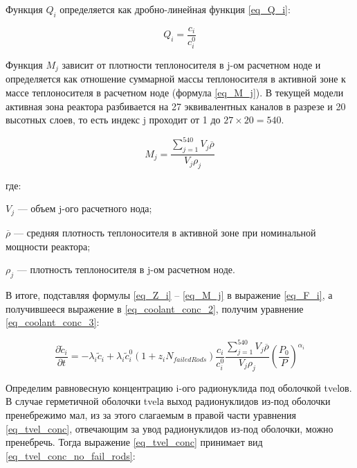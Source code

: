 Функция $Q_{i}$ определяется как дробно-линейная функция \ref{eq_Q_i}:

\begin{equation}
    \label{eq_Q_i}
    Q_{i} = \frac{c_{i}}{c_{i}^{0}}
\end{equation}

Функция $M_{j}$ зависит от плотности теплоносителя в j-ом расчетном ноде и определяется как отношение суммарной массы 
теплоносителя в активной зоне к массе теплоносителя в расчетном ноде (формула \ref{eq_M_j}). В текущей модели активная 
зона реактора разбивается на 27 эквивалентных каналов в разрезе и 20 высотных слоев, то есть индекс j проходит от 1 до 
$27 \times 20 = 540$.

\begin{equation}
    \label{eq_M_j}
    M_{j} = \frac{\sum_{j=1}^{540} V_{j}\overline{\rho}}{V_{j}\rho_{j}}
\end{equation}

где:
\begin{description}
    \item $V_{j}$ --- объем j-ого расчетного нода;
    \item $\overline{\rho}$ --- средняя плотность теплоносителя в активной зоне при номинальной мощности реактора;
    \item $\rho_{j}$ --- плотность теплоносителя в j-ом расчетном ноде.
\end{description}

В итоге, подставляя формулы \ref{eq_Z_i} -- \ref{eq_M_j} в выражение \ref{eq_F_i}, а получившееся выражение в 
\ref{eq_coolant_conc_2}, получим уравнение \ref{eq_coolant_conc_3}:

\begin{equation}
    \label{eq_coolant_conc_3}
    \frac{\partial \widetilde{c}_{i}}{\partial t} = -\lambda_{i}\widetilde{c}_{i} + \lambda_{i}\widetilde{c}_{i}^{0}
        (1 + z_{i}N_{failedRods})\frac{c_{i}}{c_{i}^{0}}\frac{\sum_{j=1}^{540} V_{j}\overline{\rho}}{V_{j}\rho_{j}}
        (\frac{P_{0}}{P})^{\alpha_{i}}
\end{equation}

Определим равновесную концентрацию i-ого радионуклида под оболочкой \ac{tvel}ов. В случае герметичной оболочки 
\ac{tvel}а выход радионуклидов из-под оболочки пренебрежимо мал, из за этого слагаемым в правой части уравнения 
\ref{eq_tvel_conc}, отвечающим за увод радионуклидов из-под оболочки, можно пренебречь. Тогда выражение 
\ref{eq_tvel_conc} принимает вид \ref{eq_tvel_conc_no_fail_rods}: 

